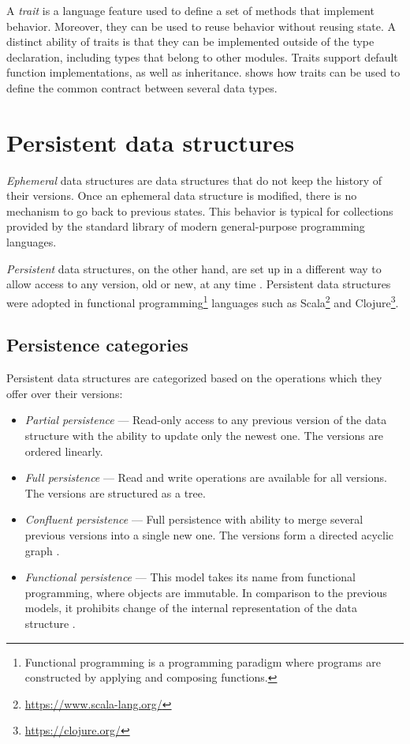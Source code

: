 A \emph{trait} is a language feature used to define a set of methods that implement behavior. Moreover, they can be used to reuse behavior without reusing state\cite{schaerli-ducasse-nierstrasz-traits}. A distinct ability of traits is that they can be implemented outside of the type declaration, including types that belong to other modules. Traits support default function implementations, as well as inheritance.  shows how traits can be used to define the common contract between several data types.

\section{Persistent data structures}
\label{sec:psds}

\emph{Ephemeral} data structures are data structures that do not keep the history of their versions. Once an ephemeral data structure is modified, there is no mechanism to go back to previous states. This behavior is typical for collections provided by the standard library of modern general-purpose programming languages.

\emph{Persistent} data structures, on the other hand, are set up in a different way to allow access to any version, old or new, at any time \cite{making-data-structures-persistent}. Persistent data structures were adopted in functional programming\footnote{Functional programming is a programming paradigm where programs are constructed by applying and composing functions.} languages such as Scala\footnote{\url{https://www.scala-lang.org/}} and Clojure\footnote{\url{https://clojure.org/}}.

\subsection{Persistence categories}
Persistent data structures are categorized based on the operations which they offer over their versions:
\begin{itemize}
    \item \textit{Partial persistence} --- Read-only access to any previous version of the data structure with the ability to update only the newest one. The versions are ordered linearly.
    \item \textit{Full persistence} --- Read and write operations are available for all versions. The versions are structured as a tree.
    \item \textit{Confluent persistence} --- Full persistence with ability to merge several previous versions into a single new one. The versions form a directed acyclic graph \cite{fully-persistent-lists-with-catenation}.
    \item \textit{Functional persistence} --- This model takes its name from functional programming, where objects are immutable. In comparison to the previous models, it prohibits change of the internal representation of the data structure \cite{purely-functional-data-structures}.
\end{itemize}

